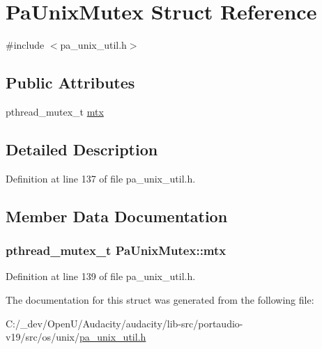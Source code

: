 \hypertarget{struct_pa_unix_mutex}{}\section{Pa\+Unix\+Mutex Struct Reference}
\label{struct_pa_unix_mutex}


{\ttfamily \#include $<$pa\+\_\+unix\+\_\+util.\+h$>$}

\subsection*{Public Attributes}
\begin{DoxyCompactItemize}
\item 
pthread\+\_\+mutex\+\_\+t \hyperlink{struct_pa_unix_mutex_acd8b70e0869bfe5b0c4ce4e9c459abc2}{mtx}
\end{DoxyCompactItemize}


\subsection{Detailed Description}


Definition at line 137 of file pa\+\_\+unix\+\_\+util.\+h.



\subsection{Member Data Documentation}
\subsubsection[{\texorpdfstring{mtx}{mtx}}]{\setlength{\rightskip}{0pt plus 5cm}pthread\+\_\+mutex\+\_\+t Pa\+Unix\+Mutex\+::mtx}\hypertarget{struct_pa_unix_mutex_acd8b70e0869bfe5b0c4ce4e9c459abc2}{}\label{struct_pa_unix_mutex_acd8b70e0869bfe5b0c4ce4e9c459abc2}


Definition at line 139 of file pa\+\_\+unix\+\_\+util.\+h.



The documentation for this struct was generated from the following file\+:\begin{DoxyCompactItemize}
\item 
C\+:/\+\_\+dev/\+Open\+U/\+Audacity/audacity/lib-\/src/portaudio-\/v19/src/os/unix/\hyperlink{pa__unix__util_8h}{pa\+\_\+unix\+\_\+util.\+h}\end{DoxyCompactItemize}
